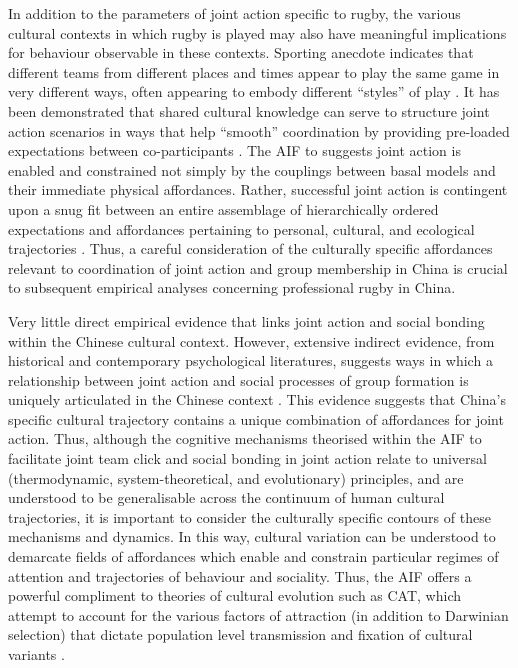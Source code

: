 \begin{CJK}{UTF8}{gbsn}
In addition to the parameters of joint action specific to rugby, the various cultural contexts in which rugby is played may also have meaningful implications for behaviour observable in these contexts.  Sporting anecdote indicates that different teams from different places and times appear to play the same game in very different ways, often appearing to embody different ``styles'' of play \citep{Bourdieu1990,Taylor2010}.  It has been demonstrated that shared cultural knowledge can serve to structure joint action scenarios in ways that help ``smooth'' coordination by providing pre-loaded expectations between co-participants \citep{Vesper2017}.  The AIF to suggests joint action is enabled and constrained not simply by the couplings between basal models and their immediate physical affordances.  Rather, successful joint action is contingent upon a snug fit between an entire assemblage of hierarchically ordered expectations and affordances pertaining to personal, cultural, and ecological trajectories \citep{Clark2013}.  Thus, a careful consideration of the culturally specific affordances relevant to coordination of joint action and group membership in China is crucial to subsequent empirical analyses concerning professional rugby in China.

Very little direct empirical evidence that links joint action and social bonding within the Chinese cultural context.  However, extensive indirect evidence, from historical and contemporary psychological literatures, suggests ways in which a relationship between joint action and social processes of group formation is uniquely articulated in the Chinese context \citep{Weed2011}.  This evidence suggests that China's specific cultural trajectory contains a unique combination of affordances for joint action.  Thus, although the cognitive mechanisms theorised within the AIF to facilitate joint team click and social bonding in joint action relate to universal (thermodynamic, system-theoretical, and evolutionary) principles, and  are understood to be generalisable across the continuum of human cultural trajectories, it is important to consider the culturally specific contours of these mechanisms and dynamics. In this way, cultural variation can be understood to demarcate fields of affordances which enable and constrain particular regimes of attention and trajectories of behaviour and sociality.  Thus, the AIF offers a powerful compliment to theories of cultural evolution such as CAT, which attempt to account for the various factors of attraction (in addition to Darwinian selection) that dictate population level transmission and fixation of cultural variants \citep[cf.][]{Claidiere2014}.


\end{CJK}
